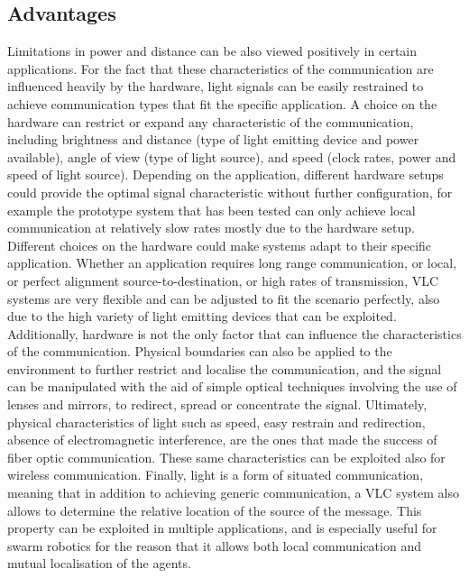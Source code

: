 \subsection{Advantages}
Limitations in power and distance can be also viewed positively in certain applications.
For the fact that these characteristics of the communication are influenced heavily by the hardware, light signals can be easily restrained to achieve communication types that fit the specific application. 
A choice on the hardware can restrict or expand any characteristic of the communication, including brightness and distance (type of light emitting device and power available), angle of view (type of light source), and speed (clock rates, power and speed of light source).
Depending on the application, different hardware setups could provide the optimal signal characteristic without further configuration, for example the prototype system that has been tested can only achieve local communication at relatively slow rates mostly due to the hardware setup.
Different choices on the hardware could make systems adapt to their specific application.
Whether an application requires long range communication, or local, or perfect alignment source-to-destination, or high rates of transmission, VLC systems are very flexible and can be adjusted to fit the scenario perfectly, also due to the high variety of light emitting devices that can be exploited.
Additionally, hardware is not the only factor that can influence the characteristics of the communication.
Physical boundaries can also be applied to the environment to further restrict and localise the communication, and the signal can be manipulated with the aid of simple optical techniques involving the use of lenses and mirrors, to redirect, spread or concentrate the signal.
Ultimately, physical characteristics of light such as speed, easy restrain and redirection, absence of electromagnetic interference, are the ones that made the success of fiber optic communication. 
These same characteristics can be exploited also for wireless communication.
\newline
Finally, light is a form of situated communication, meaning that in addition to achieving generic communication, a VLC system also allows to determine the relative location of the source of the message.
This property can be exploited in multiple applications, and is especially useful for swarm robotics for the reason that it allows both local communication and mutual localisation of the agents.

